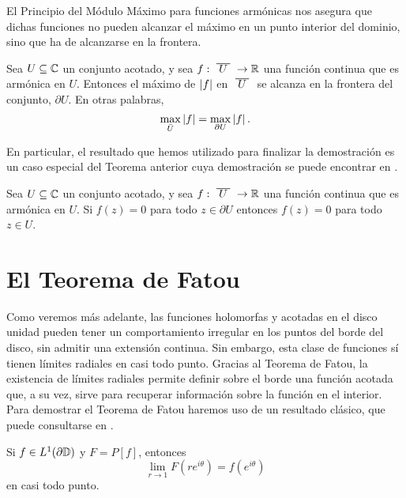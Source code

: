 El Principio del Módulo Máximo para funciones armónicas nos asegura que dichas funciones no pueden alcanzar el máximo en un punto interior del dominio, sino que ha de alcanzarse en la frontera. \\

\begin{theorem}
    Sea $U \subseteq \mathbb{C}$ un conjunto acotado, y sea $f: \xbar{U} \to \real$ una función continua que es armónica en $U$. Entonces el máximo de $\left\lvert f\right\rvert$ en $\xbar{U}$ se alcanza en la frontera del conjunto, $\partial U$. En otras palabras,
    \begin{equation*}
        \max_{\bar{U}} \left\lvert f\right\rvert = \max_{\partial U}\left\lvert f\right\rvert.
    \end{equation*}
\end{theorem}

En particular, el resultado que hemos utilizado para finalizar la demostración es un caso especial del Teorema anterior cuya demostración se puede encontrar en \citet[capítulo 10]{conway1}. \\

\begin{corollary}
    Sea $U \subseteq \mathbb{C}$ un conjunto acotado, y sea $f: \xbar{U} \to \real$ una función continua que es armónica en $U$. Si $f(z) = 0$ para todo $z \in \partial U$ entonces $f(z) = 0$ para todo $z \in U$.
\end{corollary}


\section{El Teorema de Fatou}

Como veremos más adelante, las funciones holomorfas y acotadas en el disco unidad pueden tener un comportamiento irregular en los puntos del borde del disco, sin admitir una extensión continua. Sin embargo, esta clase de funciones sí tienen límites radiales en casi todo punto. Gracias al Teorema de Fatou, la existencia de límites radiales permite definir sobre el borde una función acotada que, a su vez, sirve para recuperar información sobre la función en el interior. \\

Para demostrar el Teorema de Fatou haremos uso de un resultado clásico, que puede consultarse en \citet[capítulo 11]{rudin}. \\

\begin{theorem} %
    \label{th:fatouaux1}
    Si $f \in L^1(\partial \mathbb{D})$ y $F = P[f]$, entonces
    \begin{equation*}
        \lim_{r \to 1} F(re^{i \theta}) = f(e^{i \theta})
    \end{equation*}
    en casi todo punto. \\
\end{theorem}

